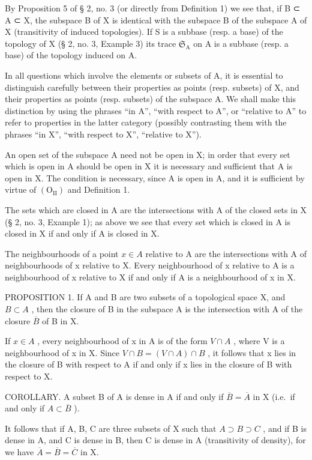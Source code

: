 By Proposition 5 of § 2, no. 3 (or directly from Definition 1) we see that, if B ⊂ A ⊂ X, the subspace B of X is identical with the subspace B of the subspace A of X (transitivity of induced topologies). If S is a subbase (resp. a base) of the topology of X (§ 2, no. 3, Example 3) its trace \(\mathfrak{S}_{\mathrm{A}}\) on A is a subbase (resp. a base) of the topology induced on A.

In all questions which involve the elements or subsets of A, it is essential to distinguish carefully between their properties as points (resp. subsets) of X, and their properties as points (resp. subsets) of the subspace A. We shall make this distinction by using the phrases ``in A'', ``with respect to A'', or ``relative to A'' to refer to properties in the latter category (possibly contrasting them with the phrases ``in X'', ``with respect to X'', ``relative to X'').

An open set of the subspace A need not be open in X; in order that every set which is open in A should be open in X it is necessary and sufficient that A is open in X. The condition is necessary, since A is open in A, and it is sufficient by virtue of \((\mathrm{O}_{\mathrm{II}})\) and Definition 1.

The sets which are closed in A are the intersections with A of the closed sets in X (§ 2, no. 3, Example 1); as above we see that every set which is closed in A is closed in X if and only if A is closed in X.

The neighbourhoods of a point \(x \in A\) relative to A are the intersections with A of neighbourhoods of x relative to X. Every neighbourhood of x relative to A is a neighbourhood of x relative to X if and only if A is a neighbourhood of x in X.

PROPOSITION 1. If A and B are two subsets of a topological space X, and \(B \subset A\) , then the closure of B in the subspace A is the intersection with A of the closure \(\overline{B}\) of B in X.

If \(x \in A\) , every neighbourhood of x in A is of the form \(V \cap A\) , where V is a neighbourhood of x in X. Since \(V \cap B = (V \cap A) \cap B\) , it follows that x lies in the closure of B with respect to A if and only if x lies in the closure of B with respect to X.

COROLLARY. A subset B of A is dense in A if and only if \(\overline{B} = \overline{A}\) in X (i.e.~if and only if \(A \subset \overline{B}\) ).

It follows that if A, B, C are three subsets of X such that \(A \supset B \supset C\) , and if B is dense in A, and C is dense in B, then C is dense in A (transitivity of density), for we have \(\overline{A} = \overline{B} = \overline{C}\) in X.

